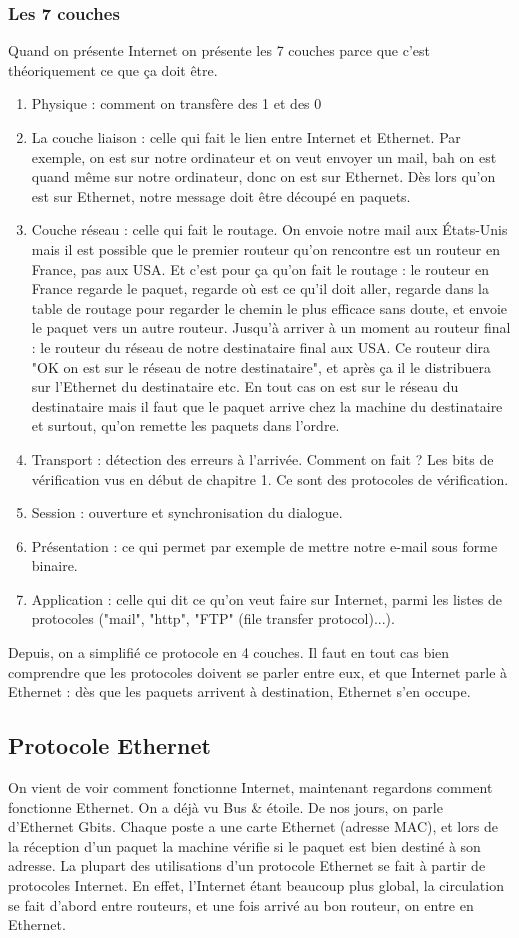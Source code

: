 \documentclass[12pt,a4paper]{report}
\begin{document}
\subsubsection{Les 7 couches}
Quand on présente Internet on présente les 7 couches parce que c'est théoriquement ce que ça doit être.
\begin{enumerate}
\item Physique : comment on transfère des 1 et des 0
\item La couche liaison : celle qui fait le lien entre Internet et Ethernet. Par exemple, on est sur notre ordinateur et on veut envoyer un mail, bah on est quand même sur notre ordinateur, donc on est sur Ethernet. Dès lors qu'on est sur Ethernet, notre message doit être découpé en paquets.
\item Couche réseau : celle qui fait le routage. On envoie notre mail aux États-Unis mais il est possible que le premier routeur qu'on rencontre est un routeur en France, pas aux USA. Et c'est pour ça qu'on fait le routage : le routeur en France regarde le paquet, regarde où est ce qu'il doit aller, regarde dans la table de routage pour regarder le chemin le plus efficace sans doute, et envoie le paquet vers un autre routeur. Jusqu'à arriver à un moment au routeur final : le routeur du réseau de notre destinataire final aux USA. Ce routeur dira "OK on est sur le réseau de notre destinataire", et après ça il le distribuera sur l'Ethernet du destinataire etc. En tout cas on est sur le réseau du destinataire mais il faut que le paquet arrive chez la machine du destinataire et surtout, qu'on remette les paquets dans l'ordre.
\item Transport : détection des erreurs à l'arrivée. Comment on fait ? Les bits de vérification vus en début de chapitre 1. Ce sont des protocoles de vérification.
\item Session : ouverture et synchronisation du dialogue.
\item Présentation : ce qui permet par exemple de mettre notre e-mail sous forme binaire.
\item Application : celle qui dit ce qu'on veut faire sur Internet, parmi les listes de protocoles ("mail", "http", "FTP" (file transfer protocol)...).
\end{enumerate}
Depuis, on a simplifié ce protocole en 4 couches. Il faut en tout cas bien comprendre que les protocoles doivent se parler entre eux, et que Internet parle à Ethernet : dès que les paquets arrivent à destination, Ethernet s'en occupe.
\subsection{Protocole Ethernet}
On vient de voir comment fonctionne Internet, maintenant regardons comment fonctionne Ethernet. On a déjà vu Bus \& étoile. De nos jours, on parle d'Ethernet Gbits. Chaque poste a une carte Ethernet (adresse MAC), et lors de la réception d'un paquet la machine vérifie si le paquet est bien destiné à son adresse. La plupart des utilisations d'un protocole Ethernet se fait à partir de protocoles Internet. En effet, l'Internet étant beaucoup plus global, la circulation se fait d'abord entre routeurs, et une fois arrivé au bon routeur, on entre en Ethernet.
\end{document}

